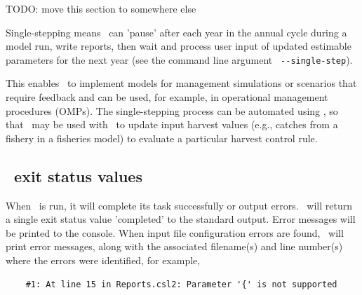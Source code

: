 TODO: move this section to somewhere else

Single-stepping means \CNAME\ can 'pause' after each year in the annual cycle during a model run, write reports, then wait and process user input of updated estimable parameters for the next year (see the command line argument \texttt{ -{}-single-step}).

This enables \CNAME\ to implement models for management simulations or scenarios that require feedback and can be used, for example, in operational management procedures (OMPs). The single-stepping process can be automated using \R, so that \CNAME\ may be used with \R\ to update input harvest values (e.g., catches from a fishery in a fisheries model) to evaluate a particular harvest control rule.

\subsection{\CNAME\ exit status values}

When \CNAME\ is run, it will complete its task successfully or output errors. \CNAME\ will return a single exit status value 'completed' to the standard output. Error messages will be printed to the console. When input file configuration errors are found, \CNAME\ will print error messages, along with the associated filename(s) and line number(s) where the errors were identified, for example,

{\small{\begin{verbatim}
	#1: At line 15 in Reports.csl2: Parameter '{' is not supported
\end{verbatim}}}
